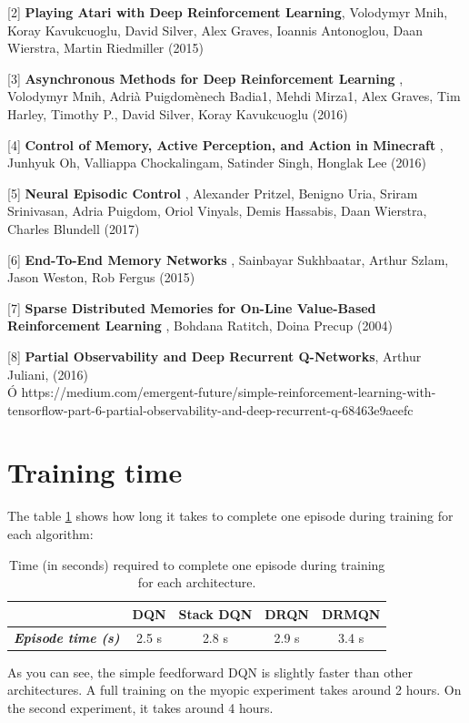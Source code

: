 \documentclass{article} %
\begin{document}
	[2]  \textbf{Playing Atari with Deep Reinforcement Learning}, Volodymyr Mnih, Koray Kavukcuoglu, David Silver, Alex Graves, Ioannis Antonoglou, Daan Wierstra, Martin Riedmiller (2015)
	\vspace{0.1cm}
	
	[3]  \textbf{Asynchronous Methods for Deep Reinforcement Learning} , Volodymyr Mnih, Adrià Puigdomènech Badia1, Mehdi Mirza1, Alex Graves, Tim Harley, Timothy P., David Silver, Koray Kavukcuoglu (2016)
	\vspace{0.1cm}
	
	[4]  \textbf{Control of Memory, Active Perception, and Action in Minecraft} , Junhyuk Oh, Valliappa Chockalingam, Satinder Singh, Honglak Lee (2016)
	\vspace{0.1cm}
	
	[5]  \textbf{Neural Episodic Control} , Alexander Pritzel, Benigno Uria, Sriram Srinivasan, Adria Puigdom, Oriol Vinyals, Demis Hassabis, Daan Wierstra, Charles Blundell (2017)
	\vspace{0.1cm}
	
	[6] \textbf{ End-To-End Memory Networks} , Sainbayar Sukhbaatar, Arthur Szlam, Jason Weston, Rob Fergus (2015)
	\vspace{0.1cm}
	
	[7]   \textbf{Sparse Distributed Memories for On-Line Value-Based Reinforcement Learning} , Bohdana Ratitch, Doina Precup (2004)
	\vspace{0.1cm}
	
	[8]  \textbf{Partial Observability and Deep Recurrent Q-Networks}, Arthur Juliani, (2016) \\Ó https://medium.com/emergent-future/simple-reinforcement-learning-with-tensorflow-part-6-partial-observability-and-deep-recurrent-q-68463e9aeefc
	
	\renewcommand\appendixname{Appendix}
	\renewcommand\appendixpagename{Appendix}
	
	\appendix
	\appendixpage
	
	\section{Training time}
	
	The table \ref{time} shows how long it takes to complete one episode during training for each algorithm:
	
	\begin{table}[!h]
		\centering
		\caption{Time (in seconds) required to complete one episode during training for each architecture.}
		\label{time}
		\begin{tabular}{c|c|c|c|c|}
			\cline{2-5}
			& \textbf{DQN} & \textbf{Stack DQN} & \textbf{DRQN} & \textbf{DRMQN} \\ \hline
			\multicolumn{1}{|c|}{\textit{\textbf{Episode time (s)}}}  & 2.5 s           & 2.8 s              &  2.9 s        & 3.4 s             \\ \hline
		\end{tabular}
	\end{table}
	
	
	As you can see, the simple feedforward DQN is slightly faster than other architectures. A full training on the myopic experiment takes around 2 hours. On the second experiment, it takes around 4 hours.
	
\end{document}
